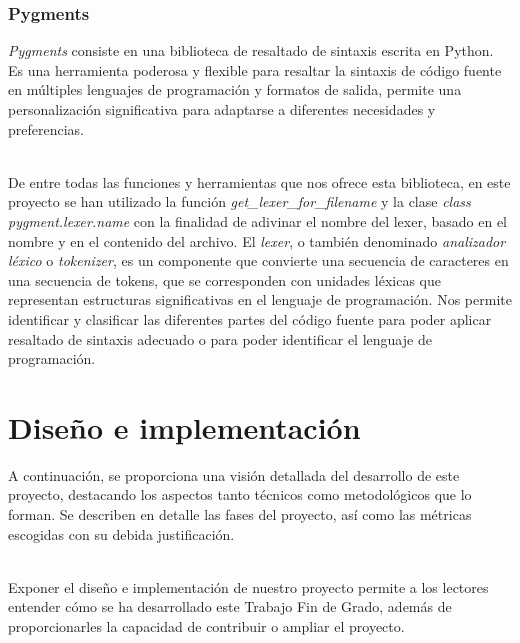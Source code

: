 \documentclass[a4paper, 12pt]{book}
\begin{document}
\subsection{Pygments}
\label{subsec:pygments}

\textit{Pygments} consiste en una biblioteca de resaltado de sintaxis escrita en Python. Es una herramienta poderosa y flexible para resaltar la sintaxis de código fuente en múltiples lenguajes de programación y formatos
de salida, permite una personalización significativa para adaptarse a diferentes necesidades y preferencias.

\\De entre todas las funciones y herramientas que nos ofrece esta biblioteca, en este proyecto se han utilizado la función \textit{get\_lexer\_for\_filename} y la clase \textit{class pygment.lexer.name} con la finalidad
de adivinar el nombre del lexer, basado en el nombre y en el contenido del archivo. El \textit{lexer}, o también denominado \textit{analizador léxico} o \textit{tokenizer}, es un componente que convierte una secuencia de caracteres
en una secuencia de tokens, que se corresponden con unidades léxicas que representan estructuras significativas en el lenguaje de programación. Nos permite identificar y clasificar las diferentes partes del código fuente para poder
aplicar resaltado de sintaxis adecuado o para poder identificar el lenguaje de programación.



\cleardoublepage
\chapter{Diseño e implementación}
\label{chap:diseño-implementacion}
\label{sec:diseno}

A continuación, se proporciona una visión detallada del desarrollo de este proyecto, destacando los aspectos tanto técnicos como metodológicos que lo forman. Se describen en detalle las fases del proyecto, así como las métricas escogidas
con su debida justificación.

\\Exponer el diseño e implementación de nuestro proyecto permite a los lectores entender cómo se ha desarrollado este Trabajo Fin de Grado, además de proporcionarles la capacidad de contribuir o ampliar el proyecto.
\end{document}
